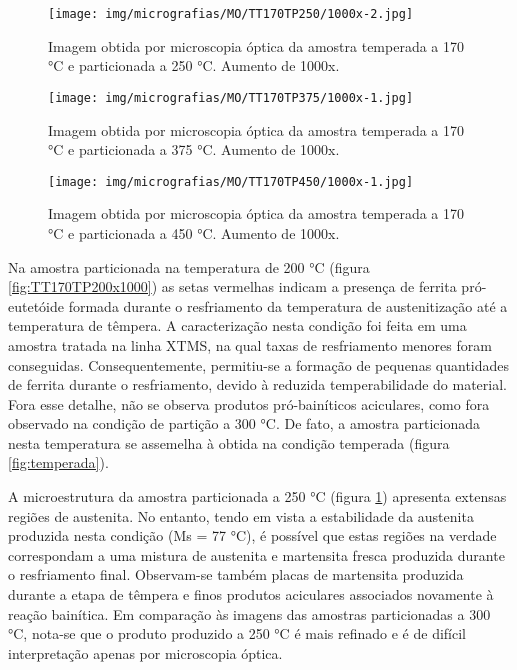 \begin{figure}
	\texttt{[image: img/micrografias/MO/TT170TP250/1000x-2.jpg]}
	\caption{Imagem obtida por microscopia óptica da amostra temperada a 170 °C e particionada a 250 °C. Aumento de 1000x.}
	\label{fig:TT170TP250x1000}
\end{figure}

\begin{figure}
	\texttt{[image: img/micrografias/MO/TT170TP375/1000x-1.jpg]}
	\caption{Imagem obtida por microscopia óptica da amostra temperada a 170 °C e particionada a 375 °C. Aumento de 1000x.}
	\label{fig:TT170TP375x1000}
\end{figure}

\begin{figure}
	\texttt{[image: img/micrografias/MO/TT170TP450/1000x-1.jpg]}
	\caption{Imagem obtida por microscopia óptica da amostra temperada a 170 °C e particionada a 450 °C. Aumento de 1000x.}
	\label{fig:TT170TP450x1000}
\end{figure}

Na amostra particionada na temperatura de 200 °C (figura \ref{fig:TT170TP200x1000}) as setas vermelhas indicam a presença de ferrita pró-eutetóide formada durante o resfriamento da temperatura de austenitização até a temperatura de têmpera. A caracterização nesta condição foi feita em uma amostra tratada na linha XTMS, na qual taxas de resfriamento menores foram conseguidas. Consequentemente, permitiu-se a formação de pequenas quantidades de ferrita durante o resfriamento, devido à reduzida temperabilidade do material. Fora esse detalhe, não se observa produtos pró-bainíticos aciculares, como fora observado na condição de partição a 300 °C. De fato, a amostra particionada nesta temperatura se assemelha à obtida na condição temperada (figura \ref{fig:temperada}).

A microestrutura da amostra particionada a 250 °C (figura \ref{fig:TT170TP250x1000}) apresenta extensas regiões de austenita. No entanto, tendo em vista a estabilidade da austenita produzida nesta condição (Ms = 77 °C), é possível que estas regiões na verdade correspondam a uma mistura de austenita e martensita fresca produzida durante o resfriamento final. Observam-se também placas de martensita produzida durante a etapa de têmpera e finos produtos aciculares associados novamente à reação bainítica. Em comparação às imagens das amostras particionadas a 300 °C, nota-se que o produto produzido a 250 °C é mais refinado e é de difícil interpretação apenas por microscopia óptica.


